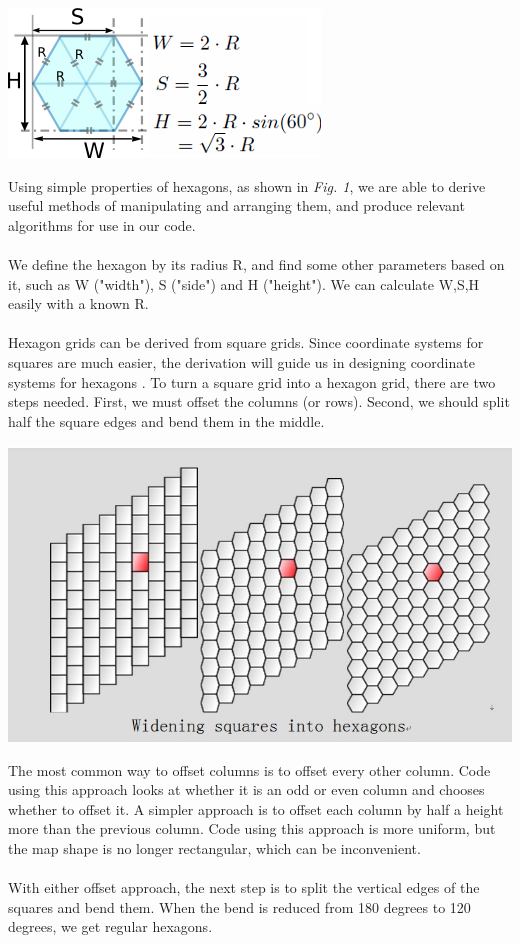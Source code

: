 \documentclass[10pt,a4paper]{article}
\begin{document}
\begin{center}
\includegraphics[scale=1]{diag1.png}\\
\end{center}
Using simple properties of hexagons, as shown in \textit{Fig. 1}, we are able to derive useful methods of manipulating and arranging them, and produce relevant algorithms for use in our code. \\
\\
We define the hexagon by its radius R, and find some other parameters based on it, such as W ("width"), S ("side") and H ("height"). We can calculate W,S,H easily with a known R.\\
\\
Hexagon grids can be derived from square grids. Since coordinate systems for squares are much easier, the derivation will guide us in designing coordinate systems for hexagons \cite{grids}. To turn a square grid into a hexagon grid, there are two steps needed. First, we must offset the columns (or rows). Second, we should split half the square edges and bend them in the middle.
\begin{center}
\includegraphics[scale=0.5]{image11.jpg}\\
\end{center}
The most common way \cite{gdmath} to offset columns is to offset every other column. Code using this approach looks at whether it is an odd or even column and chooses whether to offset it. A simpler approach is to offset each column by half a height more than the previous column. Code using this approach is more uniform, but the map shape is no longer rectangular, which can be inconvenient.\\
\\
With either offset approach, the next step is to split the vertical edges of the squares and bend them. When the bend is reduced from 180 degrees to 120 degrees, we get regular hexagons.
\end{document}
